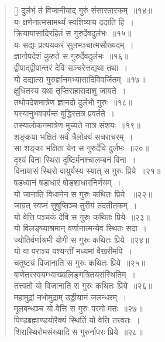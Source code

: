 \documentclass[twoside,12pt,notitlepage]{book}
\begin{document}
\begin{verse}[\versewidth]
दुर्लभं तं विजानीयाद् गुरुं संसारतारकम्~॥१४॥\\
यः क्षणेनात्मसामर्थ्यं स्वशिष्याय ददाति हि~।\\[-6pt]
क्रियायासादिरहितं स गुरुर्देवदुर्लभः~॥१५॥\\
यः सद्यः प्रत्ययकरं सुलभञ्चात्मसौख्यदम्~।\\[-6pt]
ज्ञानोपदेशं कुरुते स गुरुर्देवदुर्लभः~॥१६॥\footA \\
द्वीपाद्द्वीपान्तरं देवि सञ्चरेत्तद्यथा तथा~।\\[-6pt]
यो दद्यात्स गुरुर्ज्ञानमभ्यासादिविवर्जितम्~॥१७॥\footA \\
क्षुधितस्य यथा तृप्तिराहारादाशु जायते~।\\[-6pt]
तथोपदेशमात्रेण ज्ञानदो दुर्लभो गुरुः~॥१८॥\\
यस्यानुभवपर्यन्तं बुद्धिस्तत्र प्रवर्तते~।\\[-6pt]
तस्यालोकनमात्रेण मुच्यते नात्र संशयः~॥१९॥\footA \\
शङ्कया भक्षितं सर्वं त्रैलोक्यं सचराचरम्~।\\[-6pt]
सा शङ्का भक्षिता येन स गुरुर्देवि दुर्लभः~॥२०॥\footA \\
दृश्यं विना स्थिरा दृष्टिर्मनश्चालम्बनं विना~।\\[-6pt]
विनायासं स्थिरो वायुर्यस्य स्यात् स गुरुः प्रिये~॥२१॥\footA \\
षडध्वानं षडाधारं षोडशाधारनिर्णयम्~।\\[-6pt]
यो जानाति विधानेन स गुरुः कथितः प्रिये ~॥२२॥\footA \\
जाग्रत् स्वप्नं सुषुप्तिञ्च तुरीयं तदतीतकम्~।\\[-6pt]
यो वेत्ति पञ्चकं देवि स गुरुः कथितः प्रिये~॥२३॥\footA \\
यो विलङ्घ्याश्रमान् वर्णानात्मन्येव स्थितः सदा~।\\[-6pt]
ज्योतिर्वर्णाश्रमी योगी स गुरुः कथितः प्रिये~॥२४॥\footA \\
यो वा पराञ्च पश्यन्तीं मध्यमां वैखरीमपि~।\\[-6pt]
चतुष्टयं विजानाति स गुरुः कथितः प्रिये~॥२५॥\footA \\
बाणेतरस्वयम्भ्वाख्यलिङ्गत्रितयसंस्थितिम्~।\\[-6pt]
तत्त्वतो यो विजानाति स गुरुः कथितः प्रिये~॥२६॥\footA \\
महामुद्रां नभोमुद्राम् उड्डीयानं जलन्धरम्~।\\[-6pt]
मूलबन्धञ्च यो वेत्ति स गुरुः परमो मतः~॥२७॥\footA \\
पिण्डब्रह्माण्डयोरैक्यं स्थितिं यो वेत्ति तत्त्वतः~।\\[-6pt]
शिरास्थिरोमसंख्यादि स गुरुर्नापरः प्रिये~॥२८॥\footA \\

\end{verse}
\end{document}
